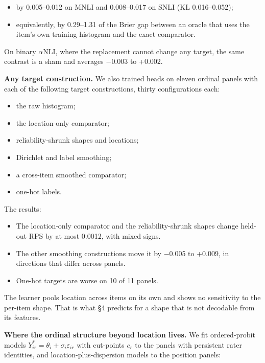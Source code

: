 \documentclass[10pt,twocolumn]{article}
\providecommand{\tightlist}{\setlength{\itemsep}{0pt}\setlength{\parskip}{0pt}}
\begin{document}
\begin{itemize}
\tightlist
\item
  by 0.005--0.012 on MNLI and 0.008--0.017 on SNLI (KL 0.016--0.052);
\item
  equivalently, by 0.29--1.31 of the Brier gap between an oracle that uses the item's own training histogram and the exact comparator.
\end{itemize}

On binary $\alpha$NLI, where the replacement cannot change any target, the same contrast is a sham and averages $-$0.003 to +0.002.

\textbf{Any target construction.} We also trained heads on eleven ordinal panels with each of the following target constructions, thirty configurations each:

\begin{itemize}
\tightlist
\item
  the raw histogram;
\item
  the location-only comparator;
\item
  reliability-shrunk shapes and locations;
\item
  Dirichlet and label smoothing;
\item
  a cross-item smoothed comparator;
\item
  one-hot labels.
\end{itemize}

The results:

\begin{itemize}
\tightlist
\item
  The location-only comparator and the reliability-shrunk shapes change held-out RPS by at most 0.0012, with mixed signs.
\item
  The other smoothing constructions move it by $-$0.005 to +0.009, in directions that differ across panels.
\item
  One-hot targets are worse on 10 of 11 panels.
\end{itemize}

The learner pools location across items on its own and shows no sensitivity to the per-item shape. That is what \S{}4 predicts for a shape that is not decodable from its features.

\textbf{Where the ordinal structure beyond location lives.} We fit ordered-probit models \(Y^*_{ir} = \theta_i + \sigma_i\varepsilon_{ir}\) with cut-points \(c_r\) to the panels with persistent rater identities, and location-plus-dispersion models to the position panels:
\end{document}
